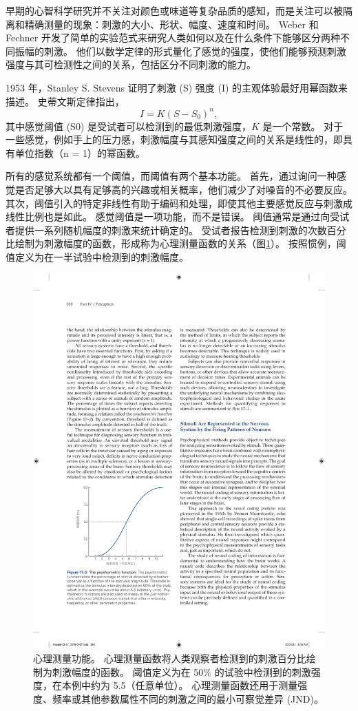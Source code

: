 早期的心智科学研究并不关注对颜色或味道等复杂品质的感知，而是关注可以被隔离和精确测量的现象：刺激的大小、形状、幅度、速度和时间。 
Weber 和 Fechner 开发了简单的实验范式来研究人类如何以及在什么条件下能够区分两种不同振幅的刺激。 
他们以数学定律的形式量化了感觉的强度，使他们能够预测刺激强度与其可检测性之间的关系，包括区分不同刺激的能力。


1953 年，Stanley S. Stevens 证明了刺激 (S) 强度 (I) 的主观体验最好用幂函数来描述。 
史蒂文斯定律指出，
\begin{equation}
	I = K(S-S_0)^n,
\end{equation}
其中感觉阈值 (S0) 是受试者可以检测到的最低刺激强度，$K$ 是一个常数。 
对于一些感觉，例如手上的压力感，刺激幅度与其感知强度之间的关系是线性的，即具有单位指数（n = 1）的幂函数。


所有的感觉系统都有一个阈值，而阈值有两个基本功能。 
首先，通过询问一种感觉是否足够大以具有足够高的兴趣或相关概率，他们减少了对噪音的不必要反应。
其次，阈值引入的特定非线性有助于编码和处理，即使其他主要感觉反应与刺激成线性比例也是如此。
感觉阈值是一项功能，而不是错误。 
阈值通常是通过向受试者提供一系列随机幅度的刺激来统计确定的。
受试者报告检测到刺激的次数百分比绘制为刺激幅度的函数，形成称为心理测量函数的关系（图\ref{fig:17_2}）。 
按照惯例，阈值定义为在一半试验中检测到的刺激幅度。

\begin{figure}[htbp]
	\centering
	\includegraphics[width=0.5\linewidth]{chap17/fig_17_2}
	\caption{心理测量功能。 
		心理测量函数将人类观察者检测到的刺激百分比绘制为刺激幅度的函数。 
		阈值定义为在 50\% 的试验中检测到的刺激强度，在本例中约为 5.5（任意单位）。 
		心理测量函数还用于测量强度、频率或其他参数属性不同的刺激之间的最小可察觉差异 (JND)。}
	\label{fig:17_2}
\end{figure}

